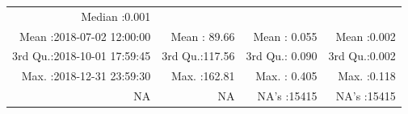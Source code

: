 \documentclass[
  10pt,
  a4paper,oneside]{article}
\begin{document}
\begin{longtable}[]{@{}rrrr@{}}
\begin{minipage}[t]{0.19\columnwidth}
Median :0.001\strut
\end{minipage}\tabularnewline
\begin{minipage}[t]{0.33\columnwidth}\raggedleft
Mean :2018-07-02 12:00:00\strut
\end{minipage} & \begin{minipage}[t]{0.19\columnwidth}\raggedleft
Mean : 89.66\strut
\end{minipage} & \begin{minipage}[t]{0.19\columnwidth}\raggedleft
Mean : 0.055\strut
\end{minipage} & \begin{minipage}[t]{0.19\columnwidth}\raggedleft
Mean :0.002\strut
\end{minipage}\tabularnewline
\begin{minipage}[t]{0.33\columnwidth}\raggedleft
3rd Qu.:2018-10-01 17:59:45\strut
\end{minipage} & \begin{minipage}[t]{0.19\columnwidth}\raggedleft
3rd Qu.:117.56\strut
\end{minipage} & \begin{minipage}[t]{0.19\columnwidth}\raggedleft
3rd Qu.: 0.090\strut
\end{minipage} & \begin{minipage}[t]{0.19\columnwidth}\raggedleft
3rd Qu.:0.002\strut
\end{minipage}\tabularnewline
\begin{minipage}[t]{0.33\columnwidth}\raggedleft
Max. :2018-12-31 23:59:30\strut
\end{minipage} & \begin{minipage}[t]{0.19\columnwidth}\raggedleft
Max. :162.81\strut
\end{minipage} & \begin{minipage}[t]{0.19\columnwidth}\raggedleft
Max. : 0.405\strut
\end{minipage} & \begin{minipage}[t]{0.19\columnwidth}\raggedleft
Max. :0.118\strut
\end{minipage}\tabularnewline
\begin{minipage}[t]{0.33\columnwidth}\raggedleft
NA\strut
\end{minipage} & \begin{minipage}[t]{0.19\columnwidth}\raggedleft
NA\strut
\end{minipage} & \begin{minipage}[t]{0.19\columnwidth}\raggedleft
NA's :15415\strut
\end{minipage} & \begin{minipage}[t]{0.19\columnwidth}\raggedleft
NA's :15415\strut
\end{minipage}\tabularnewline
\bottomrule
\end{longtable}
\end{document}

